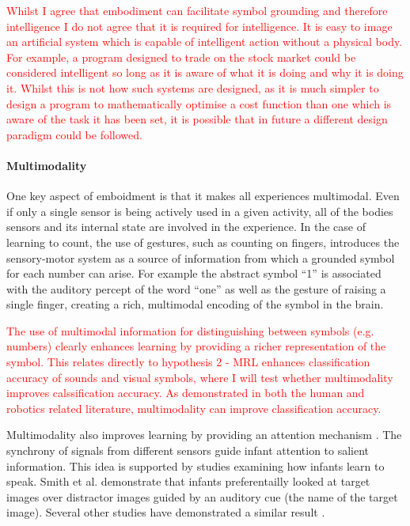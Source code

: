 \textcolor{red}{Whilst I agree that embodiment can facilitate symbol grounding and therefore intelligence I do not agree that it is required for intelligence. It is easy to image an artificial system which is capable of intelligent action without a physical body. For example, a program designed to trade on the stock market could be considered intelligent so long as it is aware of what it is doing and why it is doing it. Whilst this is not how such systems are designed, as it is much simpler to design a program to mathematically optimise a cost function than one which is aware of the task it has been set, it is possible that in future a different design paradigm could be followed.}

\paragraph{Multimodality}
One key aspect of emboidment is that it makes all experiences multimodal. Even if only a single sensor is being actively used in a given activity, all of the bodies sensors and its internal state are involved in the experience. 
In the case of learning to count, the use of gestures, such as counting on fingers, introduces the sensory-motor system as a source of information from which a grounded symbol for each number can arise. For example the abstract symbol ``1'' is associated with the auditory percept of the word ``one'' as well as the gesture of raising a single finger, creating a rich, multimodal encoding of the symbol in the brain.

\textcolor{red}{The use of multimodal information for distinguishing between symbols (e.g. numbers) clearly enhances learning by providing a richer representation of the symbol. This relates directly to hypothesis 2 - \ac{MRL} enhances classification accuracy of sounds and visual symbols, where I will test whether multimodality improves calssification accuracy. As demonstrated in both the human and robotics related literature, multimodality can improve classification accuracy.} 

Multimodality also improves learning by providing an attention mechanism \cite{bahrick2000intersensory}. The synchrony of signals from different sensors guide infant attention to salient information. This idea is supported by studies examining how infants learn to speak.  Smith et al. \cite{smith2008infants} demonstrate that infants preferentailly looked at target images over distractor images guided by an auditory cue (the name of the target image). Several other studies have demonstrated a similar result \cite{walker2010preverbal, fischer2011multi, scott20122, slater1999intermodal}.

